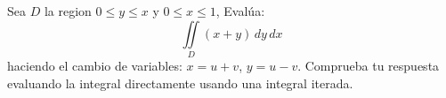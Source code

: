 Sea $D$ la region $0 \leq y \leq x$ y $0 \leq x \leq 1$,  Evalúa:
\[\iint\limits_D (x+y) \, dy \, dx\]
haciendo el cambio de variables: $x = u+v$, $y = u-v$. Comprueba tu respuesta evaluando la integral directamente usando una integral iterada.
